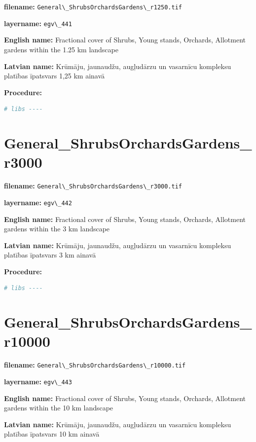 \documentclass[
]{book}
\newcommand{\passthrough}[1]{#1}
\begin{document}
\textbf{filename:} \passthrough{\lstinline!General\_ShrubsOrchardsGardens\_r1250.tif!}

\textbf{layername:} \passthrough{\lstinline!egv\_441!}

\textbf{English name:} Fractional cover of Shrubs, Young stands, Orchards, Allotment gardens within the 1.25 km landscape

\textbf{Latvian name:} Krūmāju, jaunaudžu, augļudārzu un vasarnīcu kompleksu platības īpatsvars 1,25 km ainavā

\textbf{Procedure:}

\begin{lstlisting}[language=R]
# libs ----
\end{lstlisting}

\section{General\_ShrubsOrchardsGardens\_r3000}\label{ch06.442}

\textbf{filename:} \passthrough{\lstinline!General\_ShrubsOrchardsGardens\_r3000.tif!}

\textbf{layername:} \passthrough{\lstinline!egv\_442!}

\textbf{English name:} Fractional cover of Shrubs, Young stands, Orchards, Allotment gardens within the 3 km landscape

\textbf{Latvian name:} Krūmāju, jaunaudžu, augļudārzu un vasarnīcu kompleksu platības īpatsvars 3 km ainavā

\textbf{Procedure:}

\begin{lstlisting}[language=R]
# libs ----
\end{lstlisting}

\section{General\_ShrubsOrchardsGardens\_r10000}\label{ch06.443}

\textbf{filename:} \passthrough{\lstinline!General\_ShrubsOrchardsGardens\_r10000.tif!}

\textbf{layername:} \passthrough{\lstinline!egv\_443!}

\textbf{English name:} Fractional cover of Shrubs, Young stands, Orchards, Allotment gardens within the 10 km landscape

\textbf{Latvian name:} Krūmāju, jaunaudžu, augļudārzu un vasarnīcu kompleksu platības īpatsvars 10 km ainavā
\end{document}
